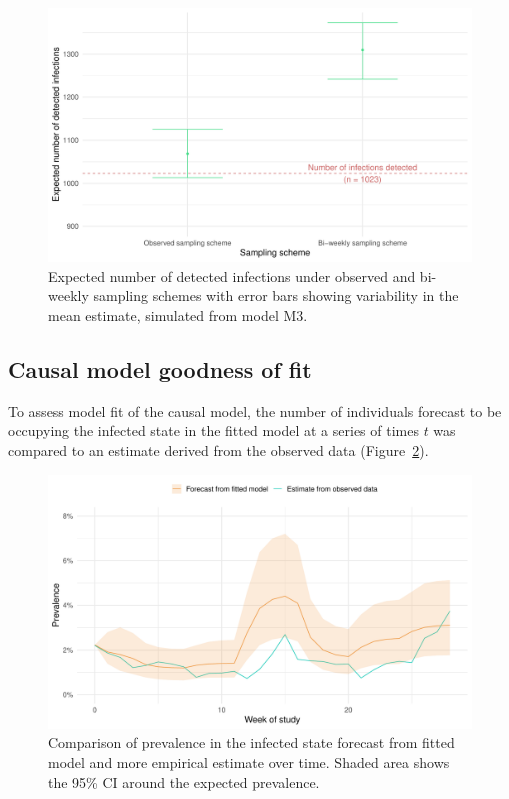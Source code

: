 \begin{figure}[htbp!]
    \centering
    \includegraphics[width=\textwidth]{04_SIREN/Figs/expected_causal_msm.pdf}
    \caption[Expected number of detected infections under observed and bi-weekly sampling schemes]{Expected number of detected infections under observed and bi-weekly sampling schemes with error bars showing variability in the mean estimate, simulated from model M3.}\label{fig:expected_causal_msm}
\end{figure}

\subsection{Causal model goodness of fit}

To assess model fit of the causal model, the number of individuals forecast to be occupying the infected state in the fitted model at a series of times $t$ was compared to an estimate derived from the observed data (Figure~\ref{fig:causal_model_diagnostics}).

\begin{figure}[htbp!]
    \centering
    \includegraphics[width=\textwidth]{causal_model_diagnostics.pdf}
    \caption[Comparison of prevalence in the infected state forecast from fitted model and more empirical estimate over time]{Comparison of prevalence in the infected state forecast from fitted model and more empirical estimate over time. Shaded area shows the 95\% CI around the expected prevalence.}\label{fig:causal_model_diagnostics}
\end{figure}
